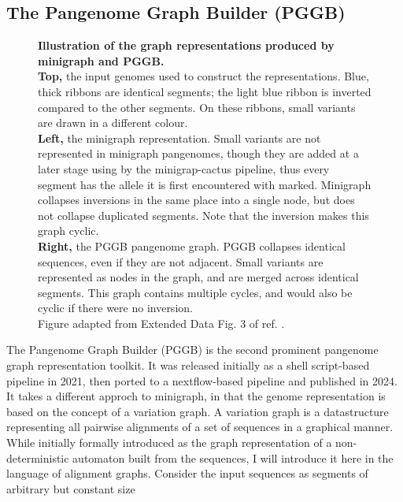 \subsection*{The Pangenome Graph Builder (PGGB)}
\begin{figure}[t]
	\centering
	
	\caption{
		\textbf{Illustration of the graph representations produced by minigraph and PGGB.}\\
		\textbf{Top,} the input genomes used to construct the representations.
		Blue, thick ribbons are identical segments; the light blue ribbon is inverted compared to the other segments.
		On these ribbons, small variants are drawn in a different colour.\\
		\textbf{Left,} the minigraph representation.
		Small variants are not represented in minigraph pangenomes, though they are added at a later stage using by the minigrap-cactus pipeline, thus every segment has the allele it is first encountered with marked.
		Minigraph collapses inversions in the same place into a single node, but does not collapse duplicated segments.
		Note that the inversion makes this graph cyclic.\\
		\textbf{Right,} the PGGB pangenome graph.
		PGGB collapses identical sequences, even if they are not adjacent.
		Small variants are represented as nodes in the graph, and are merged across identical segments.
		This graph contains multiple cycles, and would also be cyclic if there were no inversion.
		\\
		Figure adapted from Extended Data Fig. 3 of ref. \cite{liao23}.
	}
	\label{fig:mgpggb}
\end{figure}
The Pangenome Graph Builder (PGGB) is the second prominent pangenome graph representation toolkit.
It was released initially as a shell script-based pipeline in 2021, then ported to a nextflow-based pipeline and published in 2024\cite{pggbv01, garrison24}.
It takes a different approch to minigraph, in that the genome representation is based on the concept of a variation graph.
A variation graph is a datastructure representing all pairwise alignments of a set of sequences in a graphical manner\cite{garrisonthesis}.
While initially formally introduced as the graph representation of a non-deterministic automaton built from the sequences, I will introduce it here in the language of alignment graphs.
Consider the input sequences as segments of arbitrary but constant size
